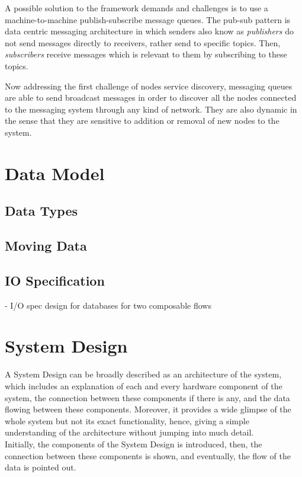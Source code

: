A possible solution to the framework demands and challenges is to use a machine-to-machine publish-subscribe message queues. The pub-sub pattern is data centric messaging architecture in which senders also know as \textit{publishers} do not send messages directly to receivers, rather send to specific topics. Then, \textit{subscribers} receive messages which is relevant to them by subscribing to these topics.

Now addressing the first challenge of nodes service discovery, messaging queues are able to send broadcast messages in order to discover all the nodes connected to the messaging system through any kind of network.  They are also dynamic in the sense that they are sensitive to addition or removal of new nodes to the system.

 
\section{Data Model}

\subsection{Data Types}


\subsection{Moving Data}

\subsection{IO Specification}
- I/O spec design for databases for two composable flows


\section{System Design }
A System Design can be broadly described as an architecture of the system, which includes an explanation of each and every hardware component of the system, the connection between these components if there is any, and the data flowing between these components. Moreover, it provides a wide glimpse of the whole system but not its exact functionality, hence, giving a simple understanding of the architecture without jumping into much detail.\\
Initially, the components of the System Design is introduced, then, the connection between these components is shown, and eventually, the flow of the data is pointed out.

